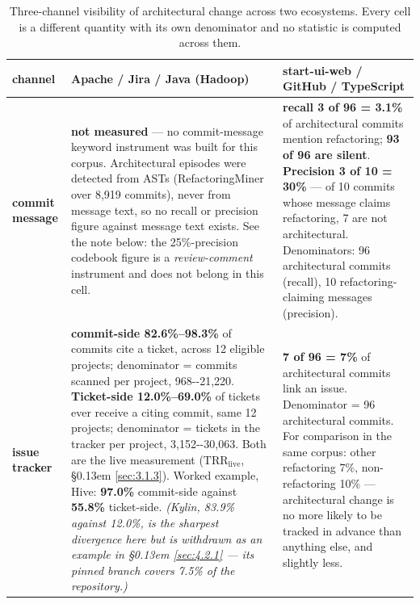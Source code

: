 \documentclass[conference]{IEEEtran}
\begin{document}
\begin{table}[htbp]

\centering

\caption{Three-channel visibility of architectural change across two ecosystems. Every cell is a different quantity with its own denominator and no statistic is computed across them.}\label{tab:visibility}

\begingroup\footnotesize\setlength{\tabcolsep}{3pt}

\begin{tabular}{>{\raggedright\arraybackslash}p{}>{\raggedright\arraybackslash}p{}>{\raggedright\arraybackslash}p{}}

\toprule

\textbf{channel} & \textbf{Apache / Jira / Java (Hadoop)} & \textbf{start-\allowbreak{}ui-\allowbreak{}web / GitHub / TypeScript} \\

\midrule

\textbf{commit message} & \textbf{not measured} --- no commit-\allowbreak{}message keyword instrument was built for this corpus. Architectural episodes were detected from ASTs (RefactoringMiner over 8,919 commits), never from message text, so no recall or precision figure against message text exists. See the note below: the 25\%-precision codebook figure is a \emph{review-comment} instrument and does not belong in this cell. & \textbf{recall 3 of 96 = 3.1\%} of architectural commits mention refactoring; \textbf{93 of 96 are silent}. \textbf{Precision 3 of 10 = 30\%} --- of 10 commits whose message claims refactoring, 7 are not architectural.\allowbreak{} Denominators: 96 architectural commits (recall), 10 refactoring-\allowbreak{}claiming messages (precision).\allowbreak{} \\

\textbf{issue tracker} & \textbf{commit-side 82.6\%--98.3\%} of commits cite a ticket, across 12 eligible projects; denominator = commits scanned per project, 968-\allowbreak{}-\allowbreak{}21,220.\allowbreak{} \textbf{Ticket-side 12.0\%--69.0\%} of tickets ever receive a citing commit, same 12 projects; denominator = tickets in the tracker per project, 3,152-\allowbreak{}-\allowbreak{}30,063.\allowbreak{} Both are the live measurement ($\mathrm{TRR}_\mathrm{live}$, \S\kern0.13em \ref{sec:3.1.3}). Worked example, Hive: \textbf{97.0\%} commit-\allowbreak{}side against \textbf{55.8\%} ticket-\allowbreak{}side.\allowbreak{} \emph{(Kylin, 83.9\% against 12.0\%, is the sharpest divergence here but is withdrawn as an example in \S\kern0.13em \ref{sec:4.2.1} --- its pinned branch covers 7.5\% of the repository.\allowbreak{})} & \textbf{7 of 96 = 7\%} of architectural commits link an issue. Denominator = 96 architectural commits. For comparison in the same corpus: other refactoring 7\%, non-\allowbreak{}refactoring 10\% --- architectural change is no more likely to be tracked in advance than anything else, and slightly less. \\


\end{tabular}
\end{table}
\end{document}
